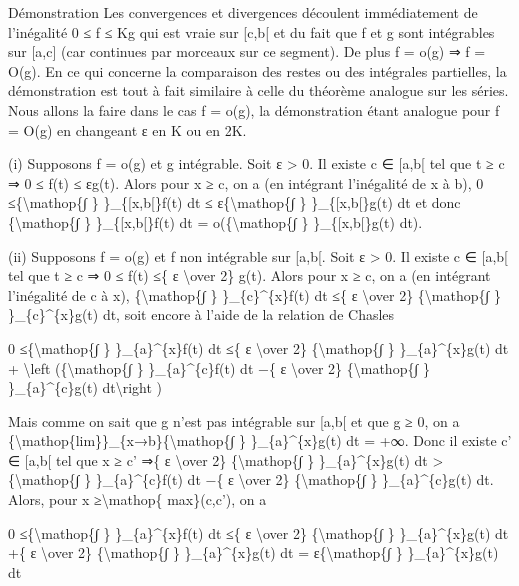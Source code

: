 \documentclass[]{article}
\begin{document}
Démonstration Les convergences et divergences découlent immédiatement de
l'inégalité 0 ≤ f ≤ Kg qui est vraie sur {[}c,b{[} et du fait que f et g
sont intégrables sur {[}a,c{]} (car continues par morceaux sur ce
segment). De plus f = o(g) ⇒ f = O(g). En ce qui concerne la comparaison
des restes ou des intégrales partielles, la démonstration est tout à
fait similaire à celle du théorème analogue sur les séries. Nous allons
la faire dans le cas f = o(g), la démonstration étant analogue pour f =
O(g) en changeant ε en K ou en 2K.

(i) Supposons f = o(g) et g intégrable. Soit ε \textgreater{} 0. Il
existe c ∈ {[}a,b{[} tel que t ≥ c ⇒ 0 ≤ f(t) ≤ εg(t). Alors pour x ≥ c,
on a (en intégrant l'inégalité de x à b), 0 ≤\{\textbackslash{}mathop\{∫
\} \}\_\{{[}x,b{[}\}f(t) dt ≤ ε\{\textbackslash{}mathop\{∫ \}
\}\_\{{[}x,b{[}\}g(t) dt et donc \{\textbackslash{}mathop\{∫ \}
\}\_\{{[}x,b{[}\}f(t) dt = o(\{\textbackslash{}mathop\{∫ \}
\}\_\{{[}x,b{[}\}g(t) dt).

(ii) Supposons f = o(g) et f non intégrable sur {[}a,b{[}. Soit ε
\textgreater{} 0. Il existe c ∈ {[}a,b{[} tel que t ≥ c ⇒ 0 ≤ f(t) ≤\{ ε
\textbackslash{}over 2\} g(t). Alors pour x ≥ c, on a (en intégrant
l'inégalité de c à x), \{\textbackslash{}mathop\{∫ \}
\}\_\{c\}\^{}\{x\}f(t) dt ≤\{ ε \textbackslash{}over 2\}
\{\textbackslash{}mathop\{∫ \} \}\_\{c\}\^{}\{x\}g(t) dt, soit encore à
l'aide de la relation de Chasles

0 ≤\{\textbackslash{}mathop\{∫ \} \}\_\{a\}\^{}\{x\}f(t) dt ≤\{ ε
\textbackslash{}over 2\} \{\textbackslash{}mathop\{∫ \}
\}\_\{a\}\^{}\{x\}g(t) dt + \textbackslash{}left
(\{\textbackslash{}mathop\{∫ \} \}\_\{a\}\^{}\{c\}f(t) dt −\{ ε
\textbackslash{}over 2\} \{\textbackslash{}mathop\{∫ \}
\}\_\{a\}\^{}\{c\}g(t) dt\textbackslash{}right )

Mais comme on sait que g n'est pas intégrable sur {[}a,b{[} et que g ≥
0, on a
\{\textbackslash{}mathop\{lim\}\}\_\{x→b\}\{\textbackslash{}mathop\{∫ \}
\}\_\{a\}\^{}\{x\}g(t) dt = +∞. Donc il existe c' ∈ {[}a,b{[} tel que x
≥ c' ⇒\{ ε \textbackslash{}over 2\} \{\textbackslash{}mathop\{∫ \}
\}\_\{a\}\^{}\{x\}g(t) dt \textgreater{}\{\textbackslash{}mathop\{∫ \}
\}\_\{a\}\^{}\{c\}f(t) dt −\{ ε \textbackslash{}over 2\}
\{\textbackslash{}mathop\{∫ \} \}\_\{a\}\^{}\{c\}g(t) dt. Alors, pour x
≥\textbackslash{}mathop\{ max\}(c,c'), on a

0 ≤\{\textbackslash{}mathop\{∫ \} \}\_\{a\}\^{}\{x\}f(t) dt ≤\{ ε
\textbackslash{}over 2\} \{\textbackslash{}mathop\{∫ \}
\}\_\{a\}\^{}\{x\}g(t) dt +\{ ε \textbackslash{}over 2\}
\{\textbackslash{}mathop\{∫ \} \}\_\{a\}\^{}\{x\}g(t) dt =
ε\{\textbackslash{}mathop\{∫ \} \}\_\{a\}\^{}\{x\}g(t) dt
\end{document}
